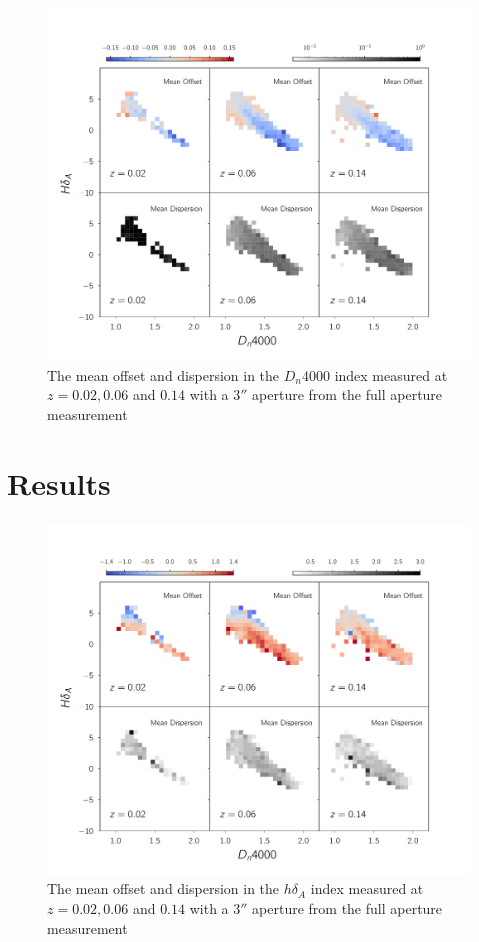 \begin{figure}
\includegraphics[width=\textwidth]{figures/dn4000_full_aperture_comparisons.pdf}
\caption[Short figure name.]{ The mean offset and dispersion in the $D_{n}4000$ index measured at $z = 0.02,0.06$ and $0.14$ with a $3''$ aperture from the full aperture measurement
\label{fig:myInlineFigure}}
\end{figure}



\section{Results}


\begin{figure}
\includegraphics[width=\textwidth]{figures/hdelta_full_aperture_comparisons.pdf}
\caption[Short figure name.]{ The mean offset and dispersion in the $h\delta_{A}$ index measured at $z = 0.02,0.06$ and $0.14$ with a $3''$ aperture from the full aperture measurement 
\label{fig:myInlineFigure}}
\end{figure}



